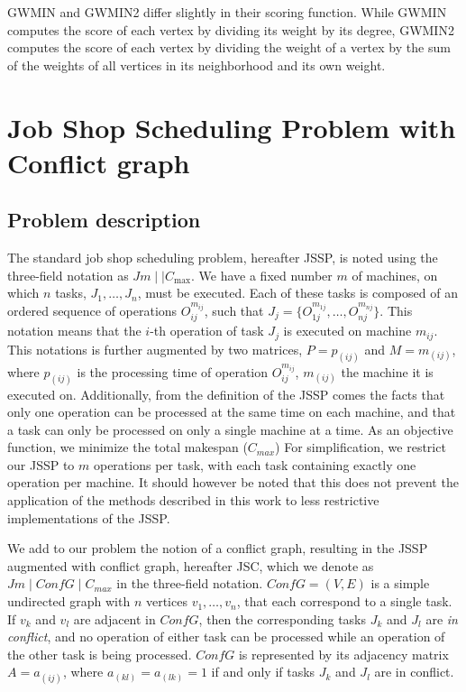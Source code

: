 \documentclass{mimosis}
\begin{document}
GWMIN and GWMIN2 differ slightly in their scoring function. While GWMIN computes the score of each vertex by dividing its weight by its degree, GWMIN2 computes the score of each vertex by dividing the weight of a vertex by the sum of the weights of all vertices in its neighborhood and its own weight.

\chapter{Job Shop Scheduling Problem with Conflict graph}

\section{Problem description}
The standard job shop scheduling problem, hereafter JSSP, is noted using the three-field notation as \(Jm \mid\mid C_{\text{max}}\). We have a fixed number \(m\) of machines, on which \(n\) tasks, \(J_1, \dots, J_n\), must be executed. Each of these tasks is composed of an ordered sequence of operations \(O_{ij}^{m_{ij}}\), such that \(J_j = \{O_{1j}^{m_{1j}}, \dots, O_{nj}^{m_{nj}}\}\). This notation means that the \(i\)-th operation of task \(J_j\) is executed on machine \(m_{ij}\). This notations is further augmented by two matrices, \(P = p_{(ij)}\) and \(M = m_{(ij)}\), where \(p_{(ij)}\) is the processing time of operation \(O_{ij}^{m_{ij}}\), \(m_{(ij)}\) the machine it is executed on. Additionally, from the definition of the JSSP comes the facts that only one operation can be processed at the same time on each machine, and that a task can only be processed on only a single machine at a time. As an objective function, we minimize the total makespan (\(C_{max}\)) For simplification, we restrict our JSSP to \(m\) operations per task, with each task containing exactly one operation per machine. It should however be noted that this does not prevent the application of the methods described in this work to less restrictive implementations of the JSSP.

We add to our problem the notion of a conflict graph, resulting in the JSSP augmented with conflict graph, hereafter JSC, which we denote as \(Jm \mid ConfG \mid C_{max}\) in the three-field notation. \(ConfG = (V,E)\) is a simple undirected graph with \(n\) vertices \(v_1, \dots, v_n\), that each correspond to a single task. If \(v_k\) and \(v_l\) are adjacent in \(ConfG\), then the corresponding tasks \(J_k\) and \(J_l\) are \emph{in conflict}, and no operation of either task can be processed while an operation of the other task is being processed. \(ConfG\) is represented by its adjacency matrix \(A = a_{(ij)}\), where \(a_{(kl)} = a_{(lk)} = 1\) if and only if tasks \(J_k\) and \(J_l\) are in conflict.
\end{document}
